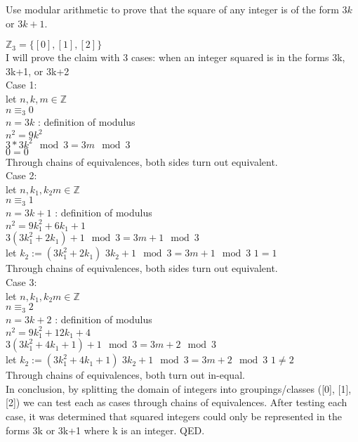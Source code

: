 \documentclass[solution,letterpaper]{cs20}
\begin{document}
    \begin{problem}
        Use modular arithmetic to prove that the square of any integer is of the form $3k$ or $3k+1$.

        \begin{solution}
            $\mathbb{Z}_3 = \{[0], [1], [2]\}$ \\
            I will prove the claim with 3 cases: when an integer squared is in the forms 3k, 3k+1, or 3k+2 \\

            Case 1:  \\
            let $n, k, m \in \mathbb{Z}$ \\
            $n \equiv_3 0$ \\
            $n = 3k$ : definition of modulus \\
            $n^2 = 9k^2$ \\
            $3*3k^2 \mod 3 = 3m \mod 3$ \\
            $0 = 0$ \\
            Through chains of equivalences, both sides turn out equivalent. \\

            Case 2: \\
            let $n, k_1, k_2 m \in \mathbb{Z}$ \\
            $n \equiv_3 1$ \\
            $n = 3k + 1$ : definition of modulus \\
            $n^2 = 9k_1^2 + 6k_1 + 1$ \\
            $3(3k_1^2 + 2k_1) + 1 \mod 3 = 3m + 1 \mod 3$ \\
            let $k_2 := (3k_1^2 + 2k_1)$
            $3k_2 + 1 \mod 3 = 3m + 1 \mod 3$
            $1 = 1$ \\
            Through chains of equivalences, both sides turn out equivalent. \\


            Case 3: \\
            let $n, k_1, k_2 m \in \mathbb{Z}$ \\
            $n \equiv_3 2$ \\
            $n = 3k + 2$ : definition of modulus \\
            $n^2 = 9k_1^2 + 12k_1 + 4$ \\
            $3(3k_1^2 + 4k_1 + 1) + 1 \mod 3 = 3m + 2 \mod 3$ \\
            let $k_2 := (3k_1^2 + 4k_1 + 1)$
            $3k_2 + 1 \mod 3 = 3m + 2 \mod 3$
            $1 \neq 2$ \\
            Through chains of equivalences, both turn out in-equal. \\

            In conclusion, by splitting the domain of integers into groupings/classes ([0], [1], [2]) we can test each as cases through chains of equivalences. After testing each case, it was determined that squared integers could only be represented in the forms 3k or 3k+1 where k is an integer. QED.


        \end{solution}
    \end{problem}
    \newpage
\end{document}
